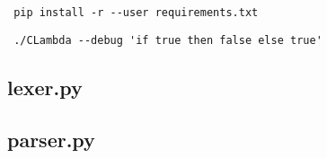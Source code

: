 \documentclass[spanish, a4paper]{article}
\begin{document}
\verb| pip install -r --user requirements.txt |

\verb| ./CLambda --debug 'if true then false else true' |

\subsection{lexer.py}
      
\newpage
\subsection{parser.py}
      

%

\end{document}
